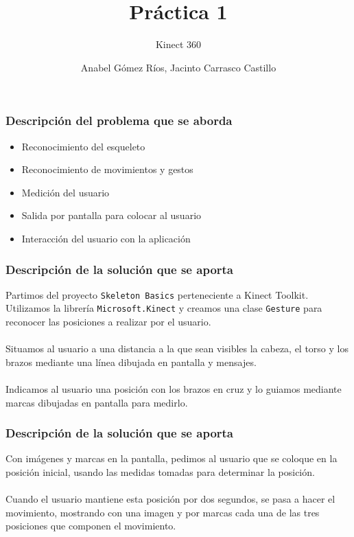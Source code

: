 \documentclass[leqno]{beamer}
\title{Pr\'actica 1}
\subtitle{Kinect 360}
\author{Anabel G\'omez R\'ios, Jacinto Carrasco Castillo}
\begin{document}
\begin{frame}
\titlepage
\end{frame}

\begin{frame}
\frametitle{Descripción del problema que se aborda}

\begin{itemize}
\item Reconocimiento del esqueleto
\item Reconocimiento de movimientos y gestos
\item Medición del usuario
\item Salida por pantalla para colocar al usuario
\item Interacción del usuario con la aplicación
\end{itemize}
\end{frame}

\begin{frame}
\frametitle{Descripción de la solución que se aporta}

Partimos del proyecto \texttt{Skeleton Basics} perteneciente a Kinect Toolkit. Utilizamos la librería \texttt{Microsoft.Kinect} y creamos una clase \texttt{Gesture} para reconocer las posiciones a realizar por el usuario.\\
\textit{ }\\
Situamos al usuario a una distancia a la que sean visibles la cabeza, el torso y los brazos mediante una línea dibujada en pantalla y mensajes.\\
\textit{ }\\
Indicamos al usuario una posición con los brazos en cruz y lo guiamos mediante marcas dibujadas en pantalla para medirlo.
\end{frame}

\begin{frame}
\frametitle{Descripción de la solución que se aporta}

Con imágenes y marcas en la pantalla, pedimos al usuario que se coloque en la posición inicial, usando las medidas tomadas para determinar la posición.\\
\textit{ }\\
Cuando el usuario mantiene esta posición por dos segundos, se pasa a hacer el movimiento, mostrando con una imagen y por marcas cada una de las tres posiciones que componen el movimiento.
\end{frame}
\end{document}
